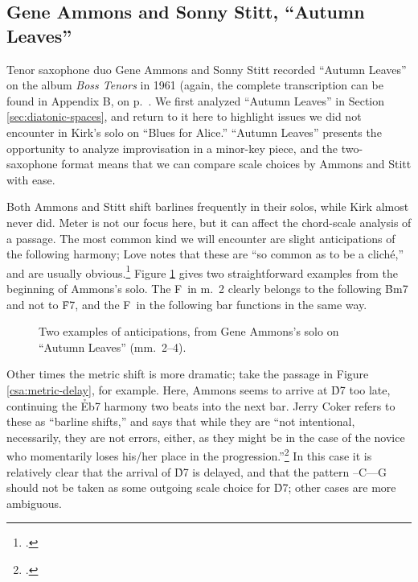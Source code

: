 \subsection{Gene Ammons and Sonny Stitt, ``Autumn Leaves''}
\label{subsec:tenors-autumn-leaves}

Tenor saxophone duo Gene Ammons and Sonny Stitt recorded ``Autumn Leaves'' on
the album \emph{Boss Tenors} in 1961 (again, the complete transcription can be
found in Appendix B, on p.~\pageref{transcription:autumn-leaves}. We first
analyzed ``Autumn Leaves'' in Section \ref{sec:diatonic-spaces}, and return to
it here to highlight issues we did not encounter in Kirk's solo on ``Blues for
Alice.'' ``Autumn Leaves'' presents the opportunity to analyze improvisation
in a minor-key piece, and the two-saxophone format means that we can compare
scale choices by Ammons and Stitt with ease.

Both Ammons and Stitt shift barlines frequently in their solos, while Kirk
almost never did. Meter is not our focus here, but it can affect the
chord-scale analysis of a passage. The most common kind we will
encounter are slight anticipations of the following harmony; Love notes that
these are ``so common as to be a cliché,'' and are usually
obvious.\footcite[51]{love:2013} Figure \ref{csa:anticipation-simple} gives
two straightforward examples from the beginning of Ammons's solo. The F\sharp\
in m.~2 clearly belongs to the following \h{Bm7} and not to \h{F7}, and the
F\nat\ in the following bar functions in the same way.

\begin{figure}[tbp]
  \caption[Two examples of anticipations, from Gene Ammons's solo on ``Autumn
    Leaves.'']{Two examples of anticipations, from Gene Ammons's solo on
    ``Autumn Leaves'' (mm.~2--4).}
  \label{csa:anticipation-simple}
\end{figure}

Other times the metric shift is more dramatic; take the passage in Figure
\ref{csa:metric-delay}, for example. Here, Ammons seems to arrive at \h{D7}
too late, continuing the \h{Eb7} harmony two beats into the next bar. Jerry
Coker refers to these as ``barline shifts,'' and says that while they are
``not intentional, necessarily, they are not errors, either, as they might be
in the case of the novice who momentarily loses his/her place in the
progression.''\footcite[83]{coker:elements} In this case it is relatively
clear that the arrival of \h{D7} is delayed, and that the pattern
\Dflat--C--\Bflat--G should not be taken as some outgoing scale choice for
\h{D7}; other cases are more ambiguous.

